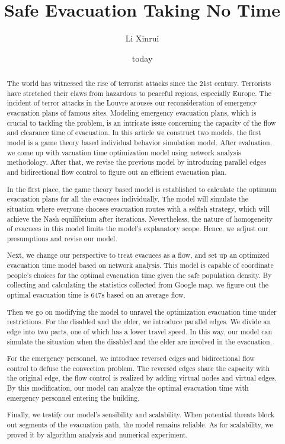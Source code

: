 \documentclass{mcmthesis}
\title{Safe Evacuation Taking No Time}
\author{Li Xinrui}
\date{today}
\begin{document}
\begin{abstract}


The world has witnessed the rise of terrorist attacks since the 21st century. Terrorists have stretched their claws from hazardous to peaceful regions, especially Europe. The incident of terror attacks in the Louvre arouses our reconsideration of emergency evacuation plans of famous sites. Modeling emergency evacuation plans, which is crucial to tackling the problem, is an intricate issue concerning the capacity of the flow and clearance time of evacuation. In this article we construct two models, the first model is a game theory based  individual behavior simulation model. After evaluation, we come up with vacuation time optimization model using network analysis methodology. After that, we revise the previous model by introducing parallel edges and bidirectional flow control  to figure out an efficient evacuation plan.

In the first place, the game theory based model is established to calculate the optimum evacuation plans for all the evacuees individually. The model will simulate the situation where everyone chooses evacuation routes with a selfish strategy, which will achieve the Nash equilibrium after iterations. Nevertheless, the nature of homogeneity of evacuees in this model limits the model’s explanatory scope. Hence, we adjust our presumptions and revise our model. 

Next, we change our perspective to treat evacuees as a flow, and set up an optimized evacuation time model based on network analysis. This model is capable of coordinate people's choices for the optimal evacuation time given the safe population density. By collecting and calculating the statistics collected from Google map, we figure out the optimal evacuation time is 647s based on an average flow. 

Then we go on modifying the model to unravel the optimization evacuation time under restrictions. For the disabled and the elder, we introduce parallel edges. We divide an edge into two parts, one of which has a lower travel speed.  In this way, our model can simulate the situation when the disabled and the elder are involved in the evacuation.

For the emergency personnel, we introduce reversed edges and bidirectional flow control to defuse the convection problem. The reversed edges share the capacity with the original edge, the flow control is realized by adding virtual nodes and virtual edges. By this modification, our model can analyze the optimal evacuation time with emergency personnel entering the building.

Finally, we testify our model's sensibility and scalability. When  potential threats block out segments of the evacuation path, the model remains reliable. As for scalability, we proved it by algorithm analysis and numerical experiment.


\end{abstract}
\end{document}
